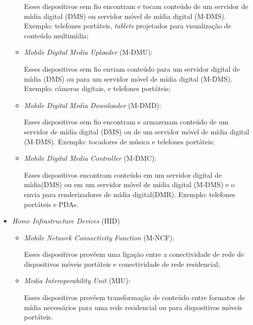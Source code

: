 \begin{itemize}
\begin{itemize}
		Esses dispositivos sem fio encontram e tocam conteúdo de um servidor de mídia digital (DMS) ou servidor móvel de mídia digital (M-DMS). Exemplo: telefones portáteis, \emph{tablets} projetados para visualização de conteúdo multimídia;
		\item \emph{Mobile Digital Media Uploader} (M-DMU): 

		Esses dispositivos sem fio enviam conteúdo para um servidor digital de mídia (DMS) ou para um servidor móvel de mídia digital (M-DMS). Exemplo: câmeras digitais, e telefones portáteis;
		\item \emph{Mobile Digital Media Downloader} (M-DMD): 

		Esses dispositivos sem fio encontram e armazenam conteúdo de um servidor de mídia digital (DMS) ou de um servidor móvel de mídia digital (M-DMS). Exemplo: tocadores de música e telefones portáteis;
		\item \emph{Mobile Digital Media Controller} (M-DMC): 

		Esses dispositivos encontram conteúdo em um servidor digital de mídia(DMS) ou em um servidor móvel de mídia digital (M-DMS) e o envia para renderizadores de mídia digital(DMR). Exemplo: telefones portáteis e PDAs.
	\end{itemize}
	\item \emph{Home Infrastructure Devices} (HID)
	\begin{itemize}
		\item \emph{Mobile Network Connectivity Function} (M-NCF): 

		Esses dispositivos provêem uma ligação entre a conectividade de rede de dispositivos móveis portáteis e conectividade de rede residencial;
		\item \emph{Media Interoperability Unit} (MIU): 

		Esses dispositivos provêem transformação de conteúdo entre formatos de mídia necessários para uma rede residencial ou para dispositivos móveis portáteis.
	\end{itemize}
\end{itemize}

